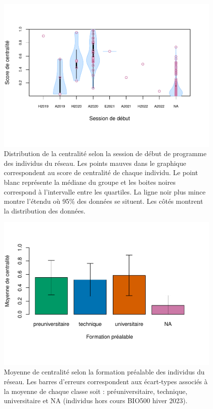 \documentclass[preprint, 3p,
authoryear]{elsarticle} %
\begin{document}
\begin{figure}
\centering
\includegraphics{rapport_files/figure-latex/unnamed-chunk-2-1.pdf}
\caption{\label{fig:plot2}Distribution de la centralité selon la session
de début de programme des individus du réseau. Les points mauves dans le
graphique correspondent au score de centralité de chaque individu. Le
point blanc représente la médiane du groupe et les boites noires
correspond à l'intervalle entre les quartiles. La ligne noir plus mince
montre l'étendu où 95\% des données se situent. Les côtés montrent la
distribution des données.}
\end{figure}

\begin{figure}
\centering
\includegraphics{rapport_files/figure-latex/unnamed-chunk-3-1.pdf}
\caption{\label{fig:plot2}Moyenne de centralité selon la formation
préalable des individus du réseau. Les barres d'erreurs correspondent
aux écart-types associés à la moyenne de chaque classe soit :
préuniversitaire, technique, universitaire et NA (individus hors cours
BIO500 hiver 2023).}
\end{figure}
\end{document}
